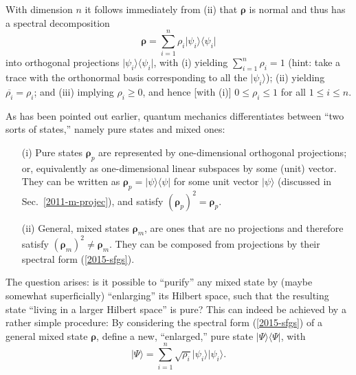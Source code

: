 With dimension $n$ it follows immediately from (ii) that $\boldsymbol{\rho}$ is normal and thus has a spectral decomposition
\begin{equation}
\boldsymbol{\rho} =\sum_{i=1}^n \rho_i \vert \psi_i\rangle \langle \psi_i \vert
\label{2015-sfgs}
\end{equation}
into orthogonal projections $\vert \psi_i\rangle \langle \psi_i \vert$,
with
(i) yielding $\sum_{i=1}^n\rho_i =1$
(hint: take a trace with the orthonormal basis corresponding to all the $\vert \psi_i\rangle$);
(ii) yielding  $\overline{\rho_i}=\rho_i$;
and (iii) implying $\rho_i \ge 0$, and hence [with (i)] $0 \le \rho_i \le 1$
for all $1\le i \le n$.


As has been pointed out earlier, quantum mechanics differentiates between ``two sorts of states,'' namely
pure states and mixed ones:
\begin{itemize}
\item[(i)]
Pure states ${\boldsymbol{\rho}}_p$  are
represented by one-dimensional orthogonal projections; or, equivalently as one-dimensional linear subspaces by some (unit) vector.
They can be written as ${\boldsymbol{\rho}}_p =  \vert \psi \rangle \langle \psi  \vert$ for some unit vector $\vert \psi \rangle$
(discussed in Sec.~\ref{2011-m-projec}), and
satisfy $({\boldsymbol{\rho}}_p)^2={\boldsymbol{\rho}}_p$.
\item[(ii)]
General, mixed states ${\boldsymbol{\rho}}_m$, are ones that are no projections and therefore
satisfy $({\boldsymbol{\rho}}_m)^2 \neq {\boldsymbol{\rho}}_m$.
They can be composed from projections by their spectral form (\ref{2015-sfgs}).
\end{itemize}

The question arises: is it possible to ``purify'' any mixed state by (maybe somewhat superficially) ``enlarging'' its
Hilbert space, such that the resulting state ``living in a larger Hilbert space'' is pure?
This can indeed be achieved by a rather simple procedure:
By considering the spectral form (\ref{2015-sfgs}) of a general mixed state ${\boldsymbol{\rho}}$,
define a new, ``enlarged,'' pure state  $\vert \Psi\rangle \langle \Psi \vert$, with
\begin{equation}
\vert \Psi\rangle = \sum_{i=1}^n \sqrt{\rho_i}  \vert \psi_i\rangle  \vert \psi_i\rangle
.
\label{2015-puran}
\end{equation}

